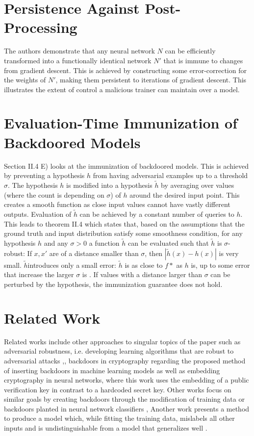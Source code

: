 \documentclass[
	fontsize=12pt,
	headings=small,
	parskip=quarter,
	bibliography=totoc,
	numbers=noenddot,       
	open=any,               
 	final                   
]{scrreprt}
\begin{document}
\section{Persistence Against Post-Processing}
The authors demonstrate that any neural network $N$ can be efficiently transformed into a functionally identical network $N'$ that is immune to changes from gradient descent. This is achieved by constructing some error-correction for the weights of $N'$, making them persistent to iterations of gradient descent. This illustrates the extent of control a malicious trainer can maintain over a model.  



\section{Evaluation-Time Immunization of Backdoored Models}
Section II.4 E) looks at the immunization of backdoored models. This is achieved by preventing a hypothesis $h$ from having adversarial examples up to a threshold $\sigma$. The hypothesis $h$ is modified into a hypothesis $\tilde{h}$ by averaging over values (where the count is depending on $\sigma$) of $h$ around the desired input point. This creates a smooth function as close input values cannot have vastly different outputs. Evaluation of $\tilde{h}$ can be achieved by a constant number of queries to $h$. This leads to theorem II.4 which states that, based on the assumptions that the ground truth and input distribution satisfy some smoothness condition, for any hypothesis $h$ and any $\sigma > 0$ a function $\tilde{h}$ can be evaluated such that  $\tilde{h}$ is $\sigma$-robust: If $x,x'$ are of a distance smaller than $\sigma$, then $|\tilde{h}(x)-h(x)|$ is very small. $\tilde{h}$introduces only a small error: $\tilde{h}$ is as close to $f*$ as $h$ is, up to some error that increase the larger $\sigma$ is \cite{goldwasser2022backdoors}.  If values with a distance larger than $\sigma$ can be perturbed by the hypothesis, the immunization guarantee does not hold.  



\section{Related Work}
Related works include other approaches to singular topics of the paper such as adversarial robustness, i.e. developing learning algorithms that are robust to adversarial attacks \cite{pmlr-v117-garg20a},\cite{pmlr-v97-bubeck19a}, backdoors in cryptography regarding the proposed method of inserting backdoors in machine learning models \cite{4031390} as well as embedding cryptography in neural networks, where this work uses the embedding of a public verification key in contrast to a hardcoded secret key. Other works focus on similar goals by creating backdoors through the modification of training data or backdoors planted in neural network classifiers \cite{8685687}, \cite{NEURIPS2022_3538a22c} Another work presents a method to produce a model which, while fitting the training data, mislabels all other inputs and is undistinguishable from a model that generalizes well \cite{moitra2022spoofinggeneralizationcanttrust}. 




\end{document}
